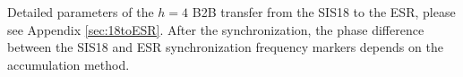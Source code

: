Detailed parameters of the $h=4$ B2B transfer from the SIS18 to the ESR, please see Appendix \ref{sec:18toESR}.   
After the synchronization, the phase difference between the SIS18 and ESR synchronization frequency markers depends on the accumulation method.

